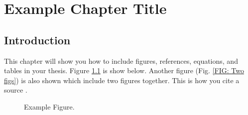 \chapter{\leavevmode\newline Example Chapter Title}
\label{chap:chapter_2}



\section{Introduction}
This chapter will show you how to include figures, references, equations, and tables in your thesis. Figure \ref{FIG: engine and num model diagram} is show below. Another figure (Fig. \ref{FIG: Two figs}) is also shown which include two figures together. This is how you cite a source \cite{yang2019bee+} \cite{nellis_klein_2012}. 


\begin{figure}
\centering
        \caption{Example Figure.}
        \label{FIG: engine and num model diagram}
\end{figure}


